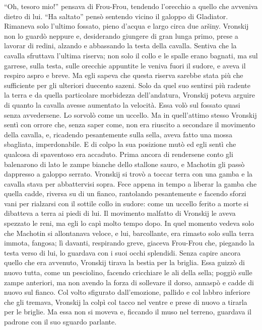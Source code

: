 ``Oh, tesoro mio!'' pensava di Frou-Frou, tendendo l'orecchio a quello che avveniva dietro di lui. ``Ha saltato'' pensò sentendo vicino il galoppo di Gladiator. Rimaneva solo l'ultimo fossato, pieno d'acqua e largo circa due aršiny. Vronskij non lo guardò neppure e, desiderando giungere di gran lunga primo, prese a lavorar di redini, alzando e abbassando la testa della cavalla. Sentiva che la cavalla sfruttava l'ultima riserva; non solo il collo e le spalle erano bagnati, ma sul garrese, sulla testa, sulle orecchie appuntite le veniva fuori il sudore, e aveva il respiro aspro e breve. Ma egli sapeva che questa riserva sarebbe stata più che sufficiente per gli ulteriori duecento sazeni. Solo da quel suo sentirsi più radente la terra e da quella particolare morbidezza dell'andatura, Vronskij poteva arguire di quanto la cavalla avesse aumentato la velocità. Essa volò sul fossato quasi senza avvedersene. Lo sorvolò come un uccello. Ma in quell'attimo stesso Vronskij sentì con orrore che, senza saper come, non era riuscito a secondare il movimento della cavalla, e, ricadendo pesantemente sulla sella, aveva fatto una mossa sbagliata, imperdonabile. E di colpo la sua posizione mutò ed egli sentì che qualcosa di spaventoso era accaduto. Prima ancora di rendersene conto gli balenarono di lato le zampe bianche dello stallone sauro, e Machotin gli passò dappresso a galoppo serrato. Vronskij si trovò a toccar terra con una gamba e la cavalla stava per abbattervisi sopra. Fece appena in tempo a liberar la gamba che quella cadde, riversa su di un fianco, rantolando pesantemente e facendo sforzi vani per rialzarsi con il sottile collo in sudore: come un uccello ferito a morte si dibatteva a terra ai piedi di lui. Il movimento malfatto di Vronskij le aveva spezzato le reni, ma egli lo capì molto tempo dopo. In quel momento vedeva solo che Machotin si allontanava veloce, e lui, barcollante, era rimasto solo sulla terra immota, fangosa; lì davanti, respirando greve, giaceva Frou-Frou che, piegando la testa verso di lui, lo guardava con i suoi occhi splendidi. Senza capire ancora quello che era avvenuto, Vronskij tirava la bestia per la briglia. Essa guizzò di nuovo tutta, come un pesciolino, facendo cricchiare le ali della sella; poggiò sulle zampe anteriori, ma non avendo la forza di sollevare il dorso, annaspò e cadde di nuovo sul fianco. Col volto sfigurato dall'emozione, pallido e col labbro inferiore che gli tremava, Vronskij la colpì col tacco nel ventre e prese di nuovo a tirarla per le briglie. Ma essa non si moveva e, ficcando il muso nel terreno, guardava il padrone con il suo sguardo parlante. 

